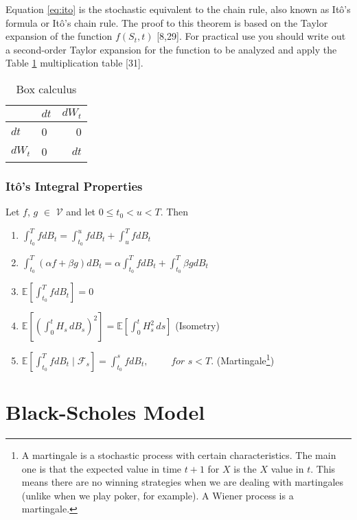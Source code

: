 \documentclass[12pt,twoside]{reedthesis}
\theoremstyle{definition}
\theoremstyle{definition}
\theoremstyle{remark}
\begin{document}
  Equation \eqref{eq:ito} is the stochastic equivalent to the chain rule,
  also known as Itô's formula or Itô's chain rule. The proof to this
  theorem is based on the Taylor expansion of the function \(f(S_t, t)\)
  {[}8,29{]}. For practical use you should write out a second-order Taylor
  expansion for the function to be analyzed and apply the Table
  \ref{tab:box-calc} multiplication table {[}31{]}.
  \begin{longtable}[t]{llr}
  \caption{\label{tab:box-calc}Box calculus}\\
  \toprule
    & $dt$ & $dW_t$\\
  \midrule
  $dt$ & 0 & 0\\
  $dW_t$ & 0 & $dt$\\
  \bottomrule
  \end{longtable}
  \subsubsection{Itô's Integral
  Properties}\label{itos-integral-properties}
  
  Let \(f\), \(g\) \(\in\) \(\mathcal{V}\) and let \(0 \leq t_0 < u < T\).
  Then
  \begin{enumerate}[label=(\roman*)]
    \item $\int_{t_0}^{T}{f dB_t} = \int_{t_0}^{u}{f dB_t} + \int_{u}^{T}{f dB_t}$
    \item $\int_{t_0}^{T}{(\alpha f + \beta g) dB_t} = \alpha  \int_{t_0}^{T}{f dB_t} + \int_{t_0}^{T}{ \beta g dB_t}$
    \item $\mathbb{E}\left[ \int_{t_0}^{T}{fdB_t}\right] = 0 $
    \item $\mathbb {E} \left[\left(\int_{0}^{t}H_{s}\,dB_{s}\right)^{2}\right]=\mathbb {E} \left[\int _{0}^{t}H_{s}^{2}\,ds\right]$ (Isometry)
    \item $ \mathbb {E}\left[ \int_{t_0}^{T}{f dB_t \mid \mathcal{F}_{s}} \right] = \int_{t_0}^{s}{f dB_t}, \,\,\,\,\,\,\,\,\,\,\,\,\,\, for \,\, s < T.$  (Martingale\footnote{A martingale is a stochastic process with certain characteristics. The main one is that the expected value in time $t+1$ for $X$ is the $X$ value in $t$. This means there are no winning strategies when we are dealing with martingales (unlike when we play poker, for example). A Wiener process is a martingale.})
  \end{enumerate}
  \section{Black-Scholes Model}\label{black-scholes-model}
  
\end{document}
